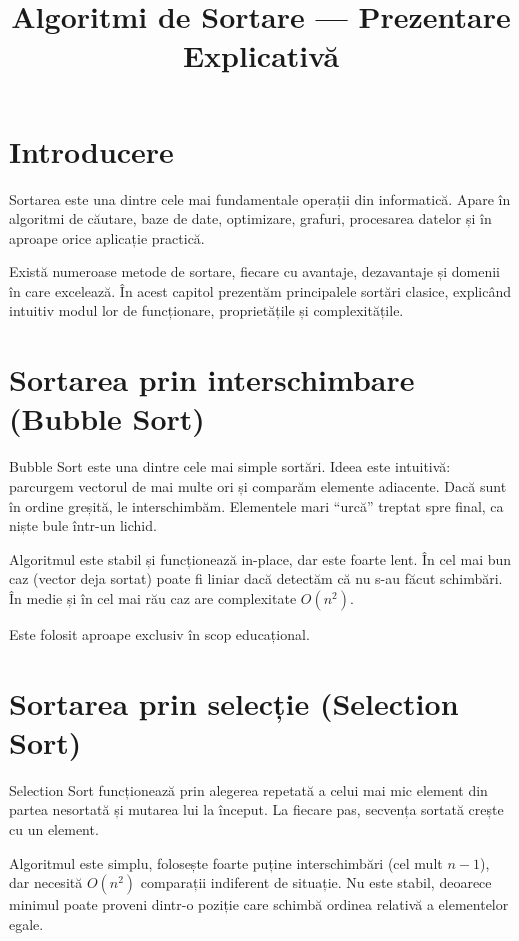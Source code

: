 \documentclass[12pt]{article}
\title{Algoritmi de Sortare — Prezentare Explicativă}
\author{}
\date{}
\begin{document}
\maketitle

\section{Introducere}

Sortarea este una dintre cele mai fundamentale operații din informatică. 
Apare în algoritmi de căutare, baze de date, optimizare, grafuri, procesarea datelor
și în aproape orice aplicație practică. 

Există numeroase metode de sortare, fiecare cu avantaje, dezavantaje și domenii
în care excelează. În acest capitol prezentăm principalele sortări clasice,
explicând intuitiv modul lor de funcționare, proprietățile și complexitățile.

\section{Sortarea prin interschimbare (Bubble Sort)}

Bubble Sort este una dintre cele mai simple sortări. Ideea este intuitivă:
parcurgem vectorul de mai multe ori și comparăm elemente adiacente. Dacă sunt în
ordine greșită, le interschimbăm. Elementele mari ``urcă'' treptat spre final,
ca niște bule într-un lichid.

Algoritmul este stabil și funcționează in-place, dar este foarte lent. 
În cel mai bun caz (vector deja sortat) poate fi liniar dacă detectăm că nu s-au
făcut schimbări. În medie și în cel mai rău caz are complexitate $O(n^2)$.

Este folosit aproape exclusiv în scop educațional.

\section{Sortarea prin selecție (Selection Sort)}

Selection Sort funcționează prin alegerea repetată a celui mai mic element din
partea nesortată și mutarea lui la început. La fiecare pas, secvența sortată
crește cu un element.

Algoritmul este simplu, folosește foarte puține interschimbări (cel mult $n-1$),
dar necesită $O(n^2)$ comparații indiferent de situație. Nu este stabil, deoarece
minimul poate proveni dintr-o poziție care schimbă ordinea relativă a elementelor
egale.
\end{document}
